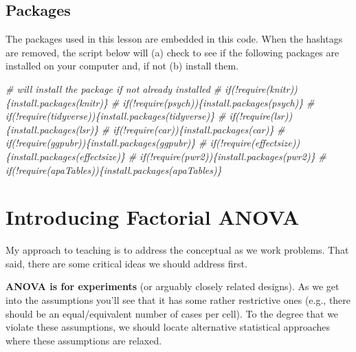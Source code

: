 \documentclass[
  11pt,
]{book}
\newenvironment{Shaded}{\begin{snugshade}}{\end{snugshade}}
\newcommand{\CommentTok}[1]{\textcolor[rgb]{0.56,0.35,0.01}{\textit{#1}}}
\begin{document}
\hypertarget{packages-4}{%
\subsection{Packages}\label{packages-4}}

The packages used in this lesson are embedded in this code. When the hashtags are removed, the script below will (a) check to see if the following packages are installed on your computer and, if not (b) install them.

\begin{Shaded}
\begin{Highlighting}[]
\CommentTok{\# will install the package if not already installed}
\CommentTok{\# if(!require(knitr))\{install.packages(\textquotesingle{}knitr\textquotesingle{})\}}
\CommentTok{\# if(!require(psych))\{install.packages(\textquotesingle{}psych\textquotesingle{})\}}
\CommentTok{\# if(!require(tidyverse))\{install.packages(\textquotesingle{}tidyverse\textquotesingle{})\}}
\CommentTok{\# if(!require(lsr))\{install.packages(\textquotesingle{}lsr\textquotesingle{})\}}
\CommentTok{\# if(!require(car))\{install.packages(\textquotesingle{}car\textquotesingle{})\}}
\CommentTok{\# if(!require(ggpubr))\{install.packages(\textquotesingle{}ggpubr\textquotesingle{})\}}
\CommentTok{\# if(!require(effectsize))\{install.packages(\textquotesingle{}effectsize\textquotesingle{})\}}
\CommentTok{\# if(!require(pwr2))\{install.packages(\textquotesingle{}pwr2\textquotesingle{})\}}
\CommentTok{\# if(!require(apaTables))\{install.packages(\textquotesingle{}apaTables\textquotesingle{})\}}
\end{Highlighting}
\end{Shaded}

\hypertarget{introducing-factorial-anova}{%
\section{Introducing Factorial ANOVA}\label{introducing-factorial-anova}}

My approach to teaching is to address the conceptual as we work problems. That said, there are some critical ideas we should address first.

\textbf{ANOVA is for experiments} (or arguably closely related designs). As we get into the assumptions you'll see that it has some rather restrictive ones (e.g., there should be an equal/equivalent number of cases per cell). To the degree that we violate these assumptions, we should locate alternative statistical approaches where these assumptions are relaxed.
\end{document}
